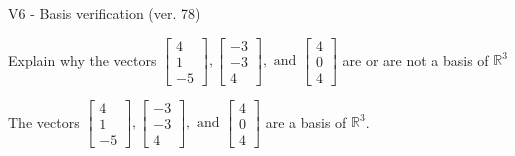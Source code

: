 \begin{exercise}
  \begin{exerciseTitle}V6 - Basis verification (ver. 78)\end{exerciseTitle}
  \begin{exerciseStatement}
    Explain why the vectors \(\left[\begin{array}{r}
4 \\
1 \\
-5
\end{array}\right] , \left[\begin{array}{r}
-3 \\
-3 \\
4
\end{array}\right] , \text{ and } \left[\begin{array}{r}
4 \\
0 \\
4
\end{array}\right]\) are or are not a basis of \(\mathbb{R}^3\)	


  \end{exerciseStatement}
  \begin{exerciseAnswer}
   The vectors \(\left[\begin{array}{r}
4 \\
1 \\
-5
\end{array}\right] , \left[\begin{array}{r}
-3 \\
-3 \\
4
\end{array}\right] , \text{ and } \left[\begin{array}{r}
4 \\
0 \\
4
\end{array}\right]\) 
  	 are  a basis of \(\mathbb{R}^3\).
  


  \end{exerciseAnswer}
\end{exercise}